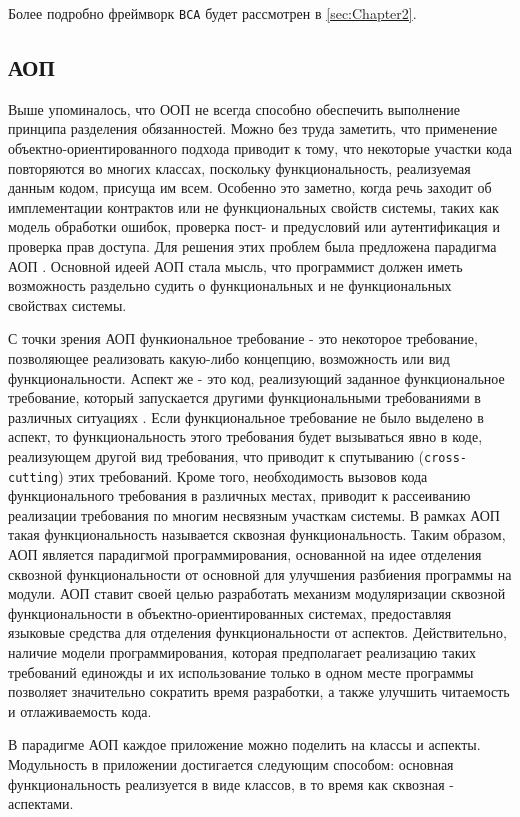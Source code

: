 Более подробно фреймворк \texttt{BCA} будет рассмотрен в \autoref{sec:Chapter2}.

\subsection{АОП}

Выше упоминалось, что ООП не всегда способно обеспечить выполнение принципа разделения обязанностей. Можно без труда заметить, что применение объектно-ориентированного подхода приводит к тому, что некоторые участки кода повторяются во многих классах, поскольку функциональность, реализуемая данным кодом, присуща им всем. Особенно это заметно, когда речь заходит об имплементации контрактов или не функциональных свойств системы, таких как модель обработки ошибок, проверка пост- и предусловий или аутентификация и проверка прав доступа. Для решения этих проблем была предложена парадигма АОП \cite{kiczales1997}. Основной идеей АОП стала мысль, что программист должен иметь возможность раздельно судить о функциональных и не функциональных свойствах системы.

С точки зрения АОП функиональное требование - это некоторое требование, позволяющее реализовать какую-либо концепцию, возможность или вид функциональности. Аспект же - это код, реализующий заданное функциональное требование, который запускается другими функциональными требованиями в различных ситуациях \cite{zhemzhicky}. Если функциональное требование не было выделено в аспект, то функциональность этого требования будет вызываться явно в коде, реализующем другой вид требования, что приводит к спутыванию (\texttt{cross-cutting}) этих требований. Кроме того, необходимость вызовов кода функционального требования в различных местах, приводит к рассеиванию реализации требования по многим несвязным участкам системы. В рамках АОП такая функциональность называется сквозная функциональность. Таким образом, АОП является парадигмой программирования, основанной на идее отделения сквозной функциональности от основной для улучшения разбиения программы на модули. АОП ставит своей целью разработать механизм модуляризации сквозной функциональности в объектно-ориентированных системах, предоставляя языковые средства для отделения функциональности от аспектов. Действительно, наличие модели программирования, которая предполагает реализацию таких требований единожды и их использование только в одном месте программы позволяет значительно сократить время разработки, а также улучшить читаемость и отлаживаемость кода.

В парадигме АОП каждое приложение можно поделить на классы и аспекты. Модульность в приложении достигается следующим способом: основная функциональность реализуется в виде классов, в то время как сквозная - аспектами.

